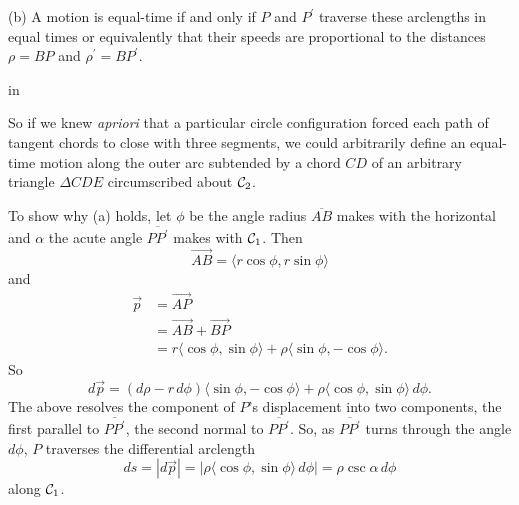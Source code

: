 \documentclass{ximera}
\newcommand{\pskip}{\vskip 0.1 in}
\begin{document}
(b) A motion is equal-time if and only if $P$ and $P^\prime$ traverse these arclengths in equal times or equivalently that their speeds are proportional to the distances $\rho = BP$ and $\rho^\prime = BP^\prime$. %

\begin{onlineOnly}
    \begin{center}
\end{center}
\end{onlineOnly}

\pskip

So if we knew \emph{apriori} that a particular circle configuration forced each path of tangent chords to close with three segments, we could arbitrarily define an equal-time motion along the outer arc subtended by a chord $CD$ of an arbitrary triangle $\Delta CDE$ circumscribed about ${\cal C}_2$. 


To show why (a) holds, let $\phi$ be the angle radius $\overline{AB}$ makes with the horizontal and $\alpha$ the acute angle $\overline{PP^\prime}$ makes with ${\cal C}_1$. Then 
\[
      \overrightarrow{AB} = \langle r\cos \phi, r\sin\phi \rangle
\]
and
\begin{align*}
    \overrightarrow{p} &= \overrightarrow{AP}   \\
                                &= \overrightarrow{AB}+\overrightarrow{BP} \\
                                &= r\langle \cos \phi, \sin \phi \rangle + \rho \langle \sin\phi, -\cos\phi  \rangle . 
\end{align*}
So
\[
    d\overrightarrow{p} = (d\rho - r \, d\phi ) \langle \sin \phi, -\cos \phi \rangle+ \rho \langle \cos\phi, \sin\phi \rangle \, d\phi .
\]
The above resolves the component of $P$'s displacement into two components, the first parallel to $\overline{PP^\prime}$, the second normal to $\overline{PP^\prime}$. So, as $\overline{PP^\prime}$ turns through the angle $d\phi$, $P$ traverses the differential arclength
\[
   ds = |d\overrightarrow{p}| = |  \rho \langle \cos\phi, \sin\phi \rangle \, d\phi |    = \rho \csc \alpha \, d\phi
\]
along ${\cal C}_1$. 
\end{document}
